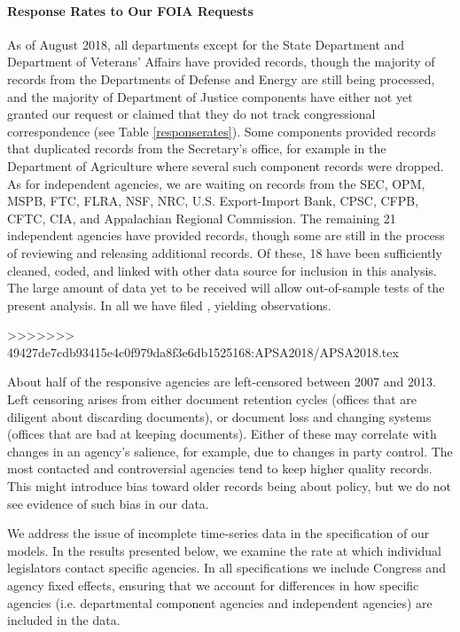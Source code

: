 \documentclass{article}
\begin{document}
\paragraph{Response Rates to Our FOIA Requests} As of August 2018, all departments except for the State Department and Department of Veterans' Affairs have provided records, though the majority of records from the Departments of Defense and Energy are still being processed, and the majority of Department of Justice components have either not yet granted our request or claimed that they do not track congressional correspondence (see Table \ref{responserates}). Some components provided records that duplicated records from the Secretary's office, for example in the Department of Agriculture where several such component records were dropped. As for independent agencies, we are waiting on records from the SEC, OPM, MSPB, FTC, FLRA, NSF, NRC, U.S. Export-Import Bank, CPSC, CFPB, CFTC, CIA, and Appalachian Regional Commission. The remaining 21 independent agencies have provided records, though some are still in the process of reviewing and releasing additional records. Of these, 18 have been sufficiently cleaned, coded, and linked with other data source for inclusion in this analysis. The large amount of data yet to be received will allow out-of-sample tests of the present analysis. In all we have filed \unskip, yielding \unskip observations.


>>>>>>> 49427de7cdb93415e4c0f979da8f3e6db1525168:APSA2018/APSA2018.tex

About half of the responsive agencies are left-censored between 2007 and 2013. Left censoring arises from either document retention cycles (offices that are diligent about discarding documents), or document loss and changing systems (offices that are bad at keeping documents). Either of these may correlate with changes in an agency's salience, for example, due to changes in party control. 
The most contacted and controversial agencies tend to keep higher quality records. 
This might introduce bias toward older records being about policy, but we do not see evidence of such bias in our data. 

We address the issue of incomplete time-series data in the specification of our models.  In the results presented below, we examine the rate at which individual legislators contact specific agencies. In all specifications we include Congress and agency fixed effects, ensuring that we account for differences in how specific agencies (i.e. departmental component agencies and independent agencies) are included in the data. 
\end{document}
